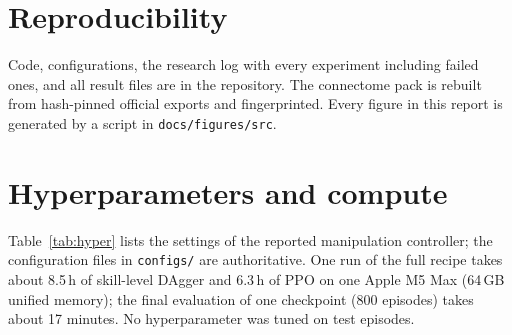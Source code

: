 \documentclass[10pt,twocolumn]{article}
\begin{document}
\section*{Reproducibility}
Code, configurations, the research log with every experiment including failed ones, and all result files are in the repository.
The connectome pack is rebuilt from hash-pinned official exports and fingerprinted.
Every figure in this report is generated by a script in \texttt{docs/figures/src}.

\appendix
\section{Hyperparameters and compute}
\label{app:hyper}

Table~\ref{tab:hyper} lists the settings of the reported manipulation controller; the configuration files in \texttt{configs/} are authoritative.
One run of the full recipe takes about 8.5\,h of skill-level DAgger and 6.3\,h of PPO on one Apple M5 Max (64\,GB unified memory); the final evaluation of one checkpoint (800 episodes) takes about 17 minutes.
No hyperparameter was tuned on test episodes.
\end{document}
